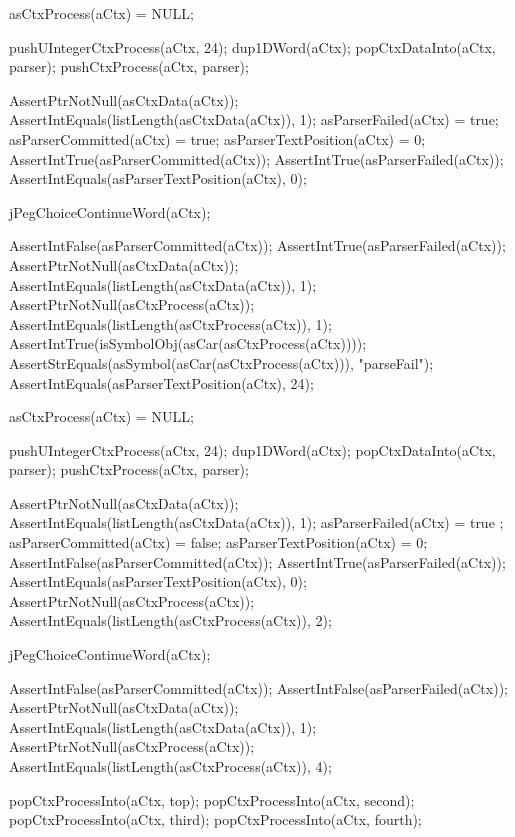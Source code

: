 
\startCTest
  asCtxProcess(aCtx) = NULL;
  
  pushUIntegerCtxProcess(aCtx, 24);
  dup1DWord(aCtx);
  popCtxDataInto(aCtx, parser);
  pushCtxProcess(aCtx, parser);
  
  AssertPtrNotNull(asCtxData(aCtx));
  AssertIntEquals(listLength(asCtxData(aCtx)), 1);
  asParserFailed(aCtx)       = true;
  asParserCommitted(aCtx)    = true;
  asParserTextPosition(aCtx) = 0;
  AssertIntTrue(asParserCommitted(aCtx));
  AssertIntTrue(asParserFailed(aCtx));
  AssertIntEquals(asParserTextPosition(aCtx), 0);
  
  jPegChoiceContinueWord(aCtx);
  
  AssertIntFalse(asParserCommitted(aCtx));
  AssertIntTrue(asParserFailed(aCtx));
  AssertPtrNotNull(asCtxData(aCtx));
  AssertIntEquals(listLength(asCtxData(aCtx)), 1);
  AssertPtrNotNull(asCtxProcess(aCtx));
  AssertIntEquals(listLength(asCtxProcess(aCtx)), 1);
  AssertIntTrue(isSymbolObj(asCar(asCtxProcess(aCtx))));
  AssertStrEquals(asSymbol(asCar(asCtxProcess(aCtx))), "parseFail");
  AssertIntEquals(asParserTextPosition(aCtx), 24);
\stopCTest
\stopTestCase


\startCTest
  asCtxProcess(aCtx) = NULL;
  
  pushUIntegerCtxProcess(aCtx, 24);
  dup1DWord(aCtx);
  popCtxDataInto(aCtx, parser);
  pushCtxProcess(aCtx, parser);
  
  AssertPtrNotNull(asCtxData(aCtx));
  AssertIntEquals(listLength(asCtxData(aCtx)), 1);
  asParserFailed(aCtx)       = true ;
  asParserCommitted(aCtx)    = false;
  asParserTextPosition(aCtx) = 0;
  AssertIntFalse(asParserCommitted(aCtx));
  AssertIntTrue(asParserFailed(aCtx));
  AssertIntEquals(asParserTextPosition(aCtx), 0);
  AssertPtrNotNull(asCtxProcess(aCtx));
  AssertIntEquals(listLength(asCtxProcess(aCtx)), 2);
  
  jPegChoiceContinueWord(aCtx); 
  
  AssertIntFalse(asParserCommitted(aCtx)); 
  AssertIntFalse(asParserFailed(aCtx));
  AssertPtrNotNull(asCtxData(aCtx)); 
  AssertIntEquals(listLength(asCtxData(aCtx)), 1); 
  AssertPtrNotNull(asCtxProcess(aCtx));
  AssertIntEquals(listLength(asCtxProcess(aCtx)), 4);
  
  popCtxProcessInto(aCtx, top);
  popCtxProcessInto(aCtx, second);
  popCtxProcessInto(aCtx, third);
  popCtxProcessInto(aCtx, fourth);
  
